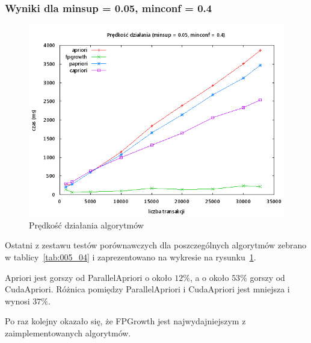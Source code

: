 
\subsubsection{Wyniki dla minsup = 0.05, minconf = 0.4}

\begin{figure}[H]
\centering
\includegraphics[width=1.1\textwidth]{figures/06/005_04.png}
\caption{Prędkość działania algorytmów\label{rys:005_04}}
\end{figure}

Ostatni z zestawu testów porównawczych dla poszczególnych algorytmów zebrano w tablicy~\ref{tab:005_04} i zaprezentowano na wykresie na rysunku~\ref{rys:005_04}. 

Apriori jest gorszy od ParallelApriori o około $12\%$, a o około $53\%$ gorszy od CudaApriori. Różnica pomiędzy ParallelApriori i CudaApriori jest mniejsza i wynosi $37\%$. 

Po raz kolejny okazało się, że FPGrowth jest najwydajniejszym z zaimplementowanych algorytmów.

